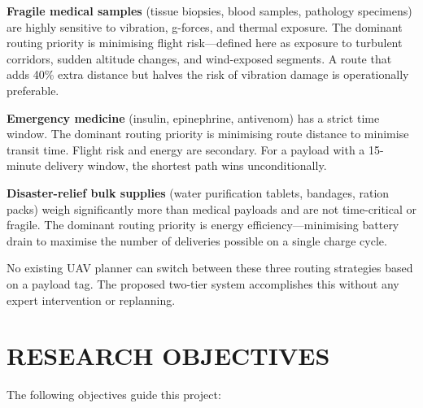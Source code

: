 \textbf{Fragile medical samples} (tissue biopsies, blood samples, pathology specimens)
are highly sensitive to vibration, g-forces, and thermal exposure. The dominant routing
priority is minimising flight risk---defined here as exposure to turbulent corridors,
sudden altitude changes, and wind-exposed segments. A route that adds 40\% extra distance
but halves the risk of vibration damage is operationally preferable.

\textbf{Emergency medicine} (insulin, epinephrine, antivenom) has a strict time window.
The dominant routing priority is minimising route distance to minimise transit time.
Flight risk and energy are secondary. For a payload with a 15-minute delivery window,
the shortest path wins unconditionally.

\textbf{Disaster-relief bulk supplies} (water purification tablets, bandages, ration
packs) weigh significantly more than medical payloads and are not time-critical or
fragile. The dominant routing priority is energy efficiency---minimising battery drain to
maximise the number of deliveries possible on a single charge cycle.

No existing UAV planner can switch between these three routing strategies based on a
payload tag. The proposed two-tier system accomplishes this without any expert
intervention or replanning.

\section{RESEARCH OBJECTIVES}

The following objectives guide this project:

